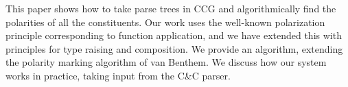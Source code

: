 This paper shows how to take parse trees in CCG and algorithmically find the polarities of all the constituents. Our work uses the well-known polarization principle corresponding to function application, and we have extended this with principles for type raising and composition. We provide an algorithm, extending the polarity marking algorithm of van Benthem. We discuss how our system works in practice, taking input from the C\&C parser.
